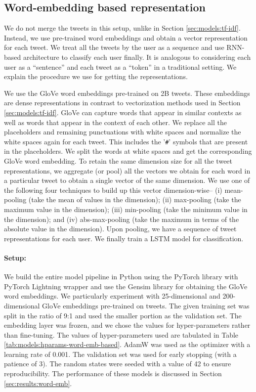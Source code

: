 \subsection{Word-embedding based representation}
\label{sec:models:word-emb-based}

We do not merge the tweets in this setup, unlike in Section \ref{sec:models:tf-idf}. Instead, we use pre-trained word embeddings and obtain a vector representation for each tweet. We treat all the tweets by the user as a sequence and use \ac{RNN}-based architecture to classify each user finally. It is analogous to considering each user as a ``sentence'' and each tweet as a ``token'' in a traditional setting. We explain the procedure we use for getting the representations.

We use the \ac{GloVe} \cite{glove} word embeddings pre-trained on 2B tweets. These embeddings are dense representations in contrast to vectorization methods used in Section \ref{sec:models:tf-idf}. \ac{GloVe} can capture words that appear in similar contexts as well as words that appear in the context of each other. We replace all the \maskEmoji{} placeholders and remaining punctuations with white spaces and normalize the white spaces again for each tweet. This includes the '\texttt{\#}' symbols that are present in the placeholders. We split the words at white spaces and get the corresponding \ac{GloVe} word embedding. To retain the same dimension size for all the tweet representations, we aggregate (or pool) all the vectors we obtain for each word in a particular tweet to obtain a single vector of the same dimension. We use one of the following four techniques to build up this vector dimension-wise-- (i) mean-pooling (take the mean of values in the dimension); (ii) max-pooling (take the maximum value in the dimension); (iii) min-pooling (take the minimum value in the dimension); and (iv) abs-max-pooling (take the maximum in terms of the absolute value in the dimension). Upon pooling, we have a sequence of tweet representations for each user. We finally train a \ac{LSTM} model \cite{lstm} for classification.


\paragraph{Setup:} We build the entire model pipeline in Python using the PyTorch \cite{pytorch} library with PyTorch Lightning \cite{pytorch_lightning} wrapper and use the Gensim \cite{gensim} library for obtaining the \ac{GloVe} word embeddings. We particularly experiment with 25-dimensional and 200-dimensional \ac{GloVe} embeddings pre-trained on tweets. The given training set was split in the ratio of 9:1 and used the smaller portion as the validation set. The embedding layer was frozen, and we chose the values for hyper-parameters rather than fine-tuning. The values of hyper-parameters used are tabulated in Table \ref{tab:models:hparams-word-emb-based}. AdamW \cite{adamw} was used as the optimizer with a learning rate of 0.001. The validation set was used for early stopping (with a patience of 3). The random states were seeded with a value of 42 to ensure reproducibility. The performance of these models is discussed in Section \ref{sec:results:word-emb}.

